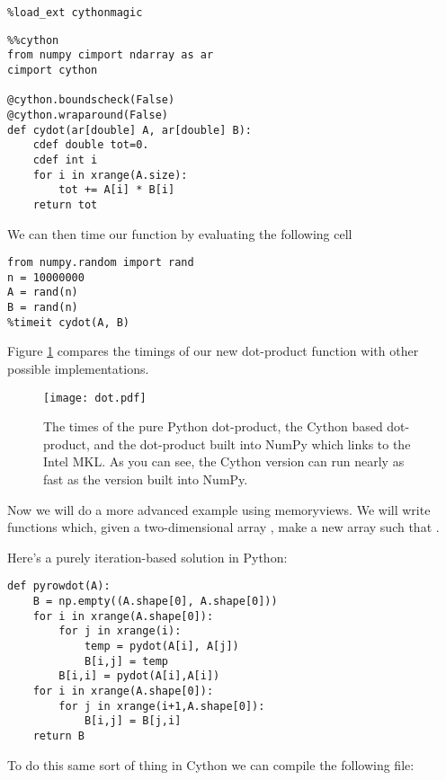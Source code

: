 \begin{lstlisting}
%load_ext cythonmagic
\end{lstlisting}

\begin{lstlisting}
%%cython
from numpy cimport ndarray as ar
cimport cython

@cython.boundscheck(False)
@cython.wraparound(False)
def cydot(ar[double] A, ar[double] B):
    cdef double tot=0.
    cdef int i
    for i in xrange(A.size):
        tot += A[i] * B[i]
    return tot
\end{lstlisting}
We can then time our function by evaluating the following cell
\begin{lstlisting}
from numpy.random import rand
n = 10000000
A = rand(n)
B = rand(n)
%timeit cydot(A, B)
\end{lstlisting}

Figure \ref{cython:dot} compares the timings of our new dot-product function with other possible implementations.

\begin{figure}
\centering
\texttt{[image: dot.pdf]}
\caption{
The times of the pure Python dot-product, the Cython based dot-product, and the dot-product built into NumPy which links to the Intel MKL.
As you can see, the Cython version can run nearly as fast as the version built into NumPy.
}
\label{cython:dot}
\end{figure}

Now we will do a more advanced example using memoryviews.
We will write functions which, given a two-dimensional array , make a new array  such that
.

Here's a purely iteration-based solution in Python:
\begin{lstlisting}
def pyrowdot(A):
    B = np.empty((A.shape[0], A.shape[0]))
    for i in xrange(A.shape[0]):
        for j in xrange(i):
            temp = pydot(A[i], A[j])
            B[i,j] = temp
        B[i,i] = pydot(A[i],A[i])
    for i in xrange(A.shape[0]):
        for j in xrange(i+1,A.shape[0]):
            B[i,j] = B[j,i]
    return B
\end{lstlisting}

To do this same sort of thing in Cython we can compile the following file:

